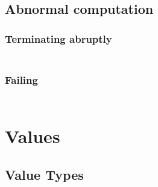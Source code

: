 \subsection*{Abnormal computation}\hypertarget{abnormal-computation}{}\label{abnormal-computation}

\subsubsection*{Terminating abruptly}\hypertarget{terminating-abruptly}{}\label{terminating-abruptly}

\begin{align*}
  [ ~ 
  \KEY{Funcon} ~ & \NAMEHYPER{../../../../../Funcons-beta/Computations/Abnormal}{Abrupting}{handle-abrupt}
  ~ ]
\end{align*}
\subsubsection*{Failing}\hypertarget{failing}{}\label{failing}

\begin{align*}
  [ ~ 
  \KEY{Funcon} ~ & \NAMEHYPER{../../../../../Funcons-beta/Computations/Abnormal}{Failing}{finalise-failing} \\
  \KEY{Funcon} ~ & \NAMEHYPER{../../../../../Funcons-beta/Computations/Abnormal}{Failing}{fail} \\
  \KEY{Funcon} ~ & \NAMEHYPER{../../../../../Funcons-beta/Computations/Abnormal}{Failing}{checked}
  ~ ]
\end{align*}
\section*{Values}\hypertarget{values}{}\label{values}

\subsection*{Value Types}\hypertarget{value-types}{}\label{value-types}

\begin{align*}
  [ ~ 
  \KEY{Type} ~ & \NAMEHYPER{../../../../../Funcons-beta/Values}{Value-Types}{values} \\
  \KEY{Alias} ~ & \NAMEHYPER{../../../../../Funcons-beta/Values}{Value-Types}{vals} \\
  \KEY{Funcon} ~ & \NAMEHYPER{../../../../../Funcons-beta/Values}{Value-Types}{is-value} \\
  \KEY{Alias} ~ & \NAMEHYPER{../../../../../Funcons-beta/Values}{Value-Types}{is-val} \\
  \KEY{Type} ~ & \NAMEHYPER{../../../../../Funcons-beta/Values}{Value-Types}{ground-values} \\
  \KEY{Alias} ~ & \NAMEHYPER{../../../../../Funcons-beta/Values}{Value-Types}{ground-vals}
  ~ ]
\end{align*}
